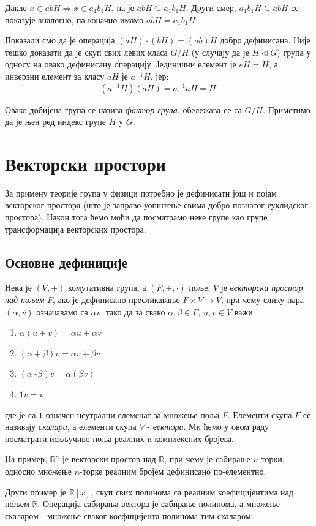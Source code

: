 \documentclass{report}
\theoremstyle{plain}
\theoremstyle{definition}
\begin{document}
Дакле $x\in abH \Rightarrow x\in a_1b_1H$, па  је $abH \subseteq a_1b_1H$. Други смер, $a_1 b_1 H \subseteq abH$ се показује аналогно, па коначно имамо $abH = a_1b_1H$.

Показали смо да је операција $(aH)\cdot (bH) = (ab)H$ добро дефинисана. Није тешко доказати да је скуп свих левих класа $G/H$ (у случају да је $H\lhd G$) група у односу на овако дефинисану операцију. Јединични елемент је $eH = H$, а инверзни елемент за класу $aH$ је $a^{-1}H$, јер:
$$(a^{-1}H)(aH) = a^{-1}aH = H.$$

Овако добијена група се назива \emph{фактор-група}, обележава се са $G/H$. Приметимо да је њен ред индекс групе $H$ у $G$.

\chapter{Векторски простори}
За примену теорије група у физици потребно је дефинисати још и појам векторског простора (што је заправо уопштење свима добро познатог еуклидског простора). Након тога ћемо моћи да посматрамо неке групе као групе трансформација векторских простора.
\section{Основне дефиниције}
Нека је $(V, +)$ комутативна група, а $(F, +, \cdot)$ поље. $V$ је \emph{векторски простор над пољем} $F$, ако је дефинисано пресликавање $F\times V\to V$, при чему слику пара $(\alpha, v)$ означавамо са $\alpha v$, тако да за свако $\alpha, \beta \in F$, $u, v\in V$ важи:
\begin{enumerate}
\item $\alpha(u+v) = \alpha u+\alpha v$
\item $(\alpha + \beta)v = \alpha v+ \beta v$
\item $(\alpha\cdot\beta)v = \alpha(\beta v)$
\item $1v = v$
\end{enumerate}
где је са $1$ означен неутрални елеменат за множење поља $F$. Елементи скупа $F$ се називају \emph{скалари}, а елементи скупа $V$ - \emph{вектори}. Ми ћемо у овом раду посматрати искључиво поља реалних и комплексних бројева.

На пример, $\mathbb{R}^n$ је векторски простор над $\mathbb{R}$, при чему је сабирање $n$-торки, односно множење $n$-торке реалним бројем дефинисано по-елементно.

Други пример је $\mathbb{R}[x]$, скуп свих полинома са реалним коефицијентима над пољем $\mathbb{R}$. Операција сабирања вектора је сабирање полинома, а множење скаларом - множење сваког коефицијента полинома тим скаларом.
\end{document}
